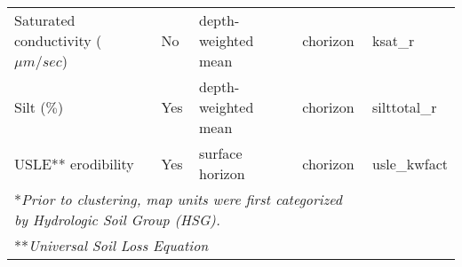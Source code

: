 \begin{table}[h]
\begin{tabular}{lllll}
		Saturated conductivity ($\mu m / sec$) & No                  & depth-weighted mean & chorizon     & ksat\_r      \\
		Silt ($\%$)                            & Yes                 & depth-weighted mean & chorizon     & silttotal\_r \\
		USLE** erodibility                     & Yes                 & surface horizon     & chorizon     & usle\_kwfact \\
		\hline
		\multicolumn{4}{l}{*\textit{Prior to clustering, map units were first categorized by Hydrologic Soil Group (HSG).}} \\
		\multicolumn{4}{l}{**\textit{Universal Soil Loss Equation}}
		\label{table:soil_attr_in_swat}
	\end{tabular}
\end{table}